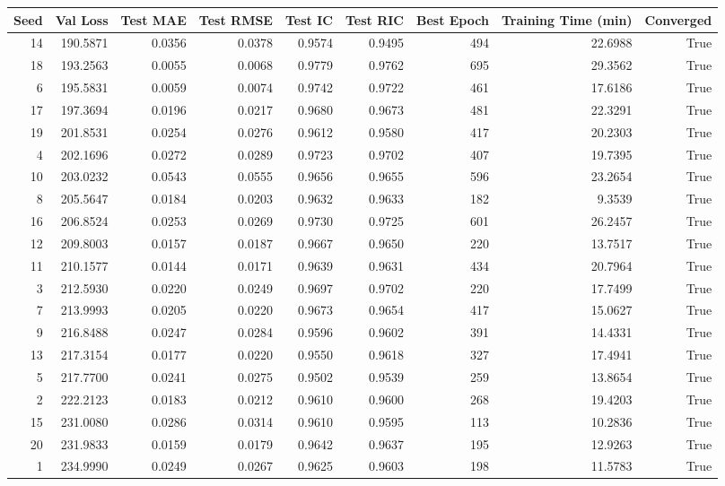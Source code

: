 \begin{tabular}{rrrrrrrrr}
\toprule
Seed & Val Loss & Test MAE & Test RMSE & Test IC & Test RIC & Best Epoch & Training Time (min) & Converged \\
\midrule
14 & 190.5871 & 0.0356 & 0.0378 & 0.9574 & 0.9495 & 494 & 22.6988 & True \\
18 & 193.2563 & 0.0055 & 0.0068 & 0.9779 & 0.9762 & 695 & 29.3562 & True \\
6 & 195.5831 & 0.0059 & 0.0074 & 0.9742 & 0.9722 & 461 & 17.6186 & True \\
17 & 197.3694 & 0.0196 & 0.0217 & 0.9680 & 0.9673 & 481 & 22.3291 & True \\
19 & 201.8531 & 0.0254 & 0.0276 & 0.9612 & 0.9580 & 417 & 20.2303 & True \\
4 & 202.1696 & 0.0272 & 0.0289 & 0.9723 & 0.9702 & 407 & 19.7395 & True \\
10 & 203.0232 & 0.0543 & 0.0555 & 0.9656 & 0.9655 & 596 & 23.2654 & True \\
8 & 205.5647 & 0.0184 & 0.0203 & 0.9632 & 0.9633 & 182 & 9.3539 & True \\
16 & 206.8524 & 0.0253 & 0.0269 & 0.9730 & 0.9725 & 601 & 26.2457 & True \\
12 & 209.8003 & 0.0157 & 0.0187 & 0.9667 & 0.9650 & 220 & 13.7517 & True \\
11 & 210.1577 & 0.0144 & 0.0171 & 0.9639 & 0.9631 & 434 & 20.7964 & True \\
3 & 212.5930 & 0.0220 & 0.0249 & 0.9697 & 0.9702 & 220 & 17.7499 & True \\
7 & 213.9993 & 0.0205 & 0.0220 & 0.9673 & 0.9654 & 417 & 15.0627 & True \\
9 & 216.8488 & 0.0247 & 0.0284 & 0.9596 & 0.9602 & 391 & 14.4331 & True \\
13 & 217.3154 & 0.0177 & 0.0220 & 0.9550 & 0.9618 & 327 & 17.4941 & True \\
5 & 217.7700 & 0.0241 & 0.0275 & 0.9502 & 0.9539 & 259 & 13.8654 & True \\
2 & 222.2123 & 0.0183 & 0.0212 & 0.9610 & 0.9600 & 268 & 19.4203 & True \\
15 & 231.0080 & 0.0286 & 0.0314 & 0.9610 & 0.9595 & 113 & 10.2836 & True \\
20 & 231.9833 & 0.0159 & 0.0179 & 0.9642 & 0.9637 & 195 & 12.9263 & True \\
1 & 234.9990 & 0.0249 & 0.0267 & 0.9625 & 0.9603 & 198 & 11.5783 & True \\
\bottomrule
\end{tabular}
